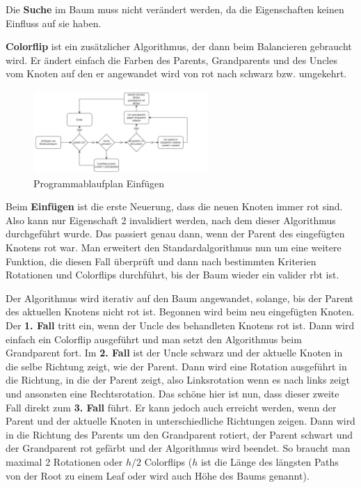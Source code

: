 \documentclass[11pt]{article}
\begin{document}
Die \textbf{Suche} im Baum muss nicht verändert werden, da die Eigenschaften keinen Einfluss auf sie haben. \cite[S. 221]{aic}

\textbf{Colorflip} ist ein zusätzlicher Algorithmus, der dann beim Balancieren gebraucht wird.
Er ändert einfach die Farben des Parents, Grandparents und des Uncles vom Knoten auf den er angewandet wird von rot nach schwarz bzw. umgekehrt.

\begin{figure}
  \centering
  \includegraphics[width=250px]{prog1.png}
  \caption{Programmablaufplan Einfügen}
\end{figure}

Beim \textbf{Einfügen} ist die erste Neuerung, dass die neuen Knoten immer rot sind. 
Also kann nur Eigenschaft 2 invalidiert werden, nach dem dieser Algorithmus durchgeführt wurde. 
Das passiert genau dann, wenn der Parent des eingefügten Knotens rot war. Man erweitert den Standardalgorithmus nun um eine weitere Funktion, 
die diesen Fall überprüft und dann nach bestimmten Kriterien Rotationen und Colorflips durchführt, bis der Baum wieder ein valider \gls{rbt} ist.

Der Algorithmus wird iterativ auf den Baum angewandet, solange, bis der Parent des aktuellen Knotens nicht rot ist. 
Begonnen wird beim neu eingefügten Knoten. Der \textbf{1. Fall} tritt ein, wenn der Uncle des behandleten Knotens rot ist. 
Dann wird einfach ein Colorflip ausgeführt und man setzt den Algorithmus beim Grandparent fort.
Im \textbf{2. Fall} ist der Uncle schwarz und der aktuelle Knoten in die selbe Richtung zeigt, wie der Parent. 
Dann wird eine Rotation ausgeführt in die Richtung, in die der Parent zeigt, also Linksrotation wenn es nach links zeigt und ansonsten eine Rechtsrotation.
Das schöne hier ist nun, dass dieser zweite Fall direkt zum \textbf{3. Fall} führt.
Er kann jedoch auch erreicht werden, wenn der Parent und der aktuelle Knoten in unterschiedliche Richtungen zeigen. Dann wird in die Richtung des Parents um den Grandparent rotiert, der Parent schwart und der Grandparent rot gefärbt und der Algorithmus wird beendet.
So braucht man maximal 2 Rotationen oder $h/2$ Colorflips ($h$ ist die Länge des längsten Paths von der Root zu einem Leaf oder wird auch Höhe des Baums genannt).
\end{document}
